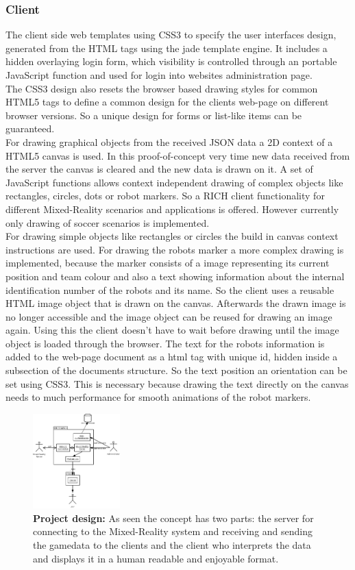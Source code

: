 \documentclass[journal]{IEEEtran}
\begin{document}
\subsubsection{Client}
The client side web templates using CSS3\cite{w3c-css3} to specify the
user interfaces design, generated from the HTML tags using the jade template
engine. It includes a hidden overlaying login form, which visibility is
controlled through an portable JavaScript function and used for login into websites administration page.\\
The CSS3 design also resets the browser based drawing styles for common HTML5
tags to define a common design for the clients web-page on different browser
versions. So a unique design for forms or list-like items can be guaranteed.\\
For drawing graphical objects from the received JSON data a 2D context of a
HTML5 canvas is used. In this proof-of-concept very time new data received from the server the
canvas is cleared and the new data is drawn on it. A set of JavaScript functions
allows context independent drawing of complex objects like rectangles, circles,
dots or robot markers. So a RICH client\cite{rich-client} functionality for
different Mixed-Reality scenarios and applications is offered. However currently only
drawing of soccer scenarios is implemented.\\
For drawing simple objects like rectangles or circles the build in canvas
context instructions\cite{w3c-canvas} are used. For drawing the robots marker a
more complex drawing is implemented, because the marker consists of a image
representing its current position and team colour and also a text showing
information about the internal identification number of the robots and its name.
So the client uses a reusable HTML image object\cite{w3c-image} that is drawn on
the canvas. Afterwards the drawn image is no longer accessible and the image
object can be reused for drawing an image again. Using this the client doesn't
have to wait before drawing until the image object is loaded through the
browser. The text for the robots information is added to the web-page document as
a html tag with unique id, hidden inside a subsection of the documents
structure. So the text position an orientation can be set using CSS3. This is
necessary because drawing the text directly on the canvas needs to much
performance for smooth animations of the robot markers.
\begin{figure}[!t]
    \centering
    \includegraphics[width=0.3\textwidth]{design.png}
    \caption{\textbf{Project design:} As seen the concept has two parts: the server for connecting to the Mixed-Reality system and receiving and sending the gamedata to the clients and the client who interprets the data and displays it in a human readable and enjoyable format.}
    \label{fig:proj_design}
\end{figure}
\end{document}
